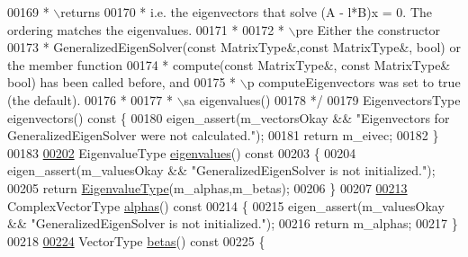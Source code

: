 \begin{DoxyCode}
00169 \textcolor{comment}{      * \(\backslash\)returns  %
00170 \textcolor{comment}{      * i.e. the eigenvectors that solve (A - l*B)x = 0. The ordering matches the eigenvalues.}
00171 \textcolor{comment}{      *}
00172 \textcolor{comment}{      * \(\backslash\)pre Either the constructor }
00173 \textcolor{comment}{      * GeneralizedEigenSolver(const MatrixType&,const MatrixType&, bool) or the member function}
00174 \textcolor{comment}{      * compute(const MatrixType&, const MatrixType& bool) has been called before, and}
00175 \textcolor{comment}{      * \(\backslash\)p computeEigenvectors was set to true (the default).}
00176 \textcolor{comment}{      *}
00177 \textcolor{comment}{      * \(\backslash\)sa eigenvalues()}
00178 \textcolor{comment}{      */}
00179     EigenvectorsType eigenvectors()\textcolor{keyword}{ const }\{
00180       eigen\_assert(m\_vectorsOkay && \textcolor{stringliteral}{"Eigenvectors for GeneralizedEigenSolver were not calculated."});
00181       \textcolor{keywordflow}{return} m\_eivec;
00182     \}
00183 
\hyperlink{group___eigenvalues___module_a62f01cd78271efd5e39bcb24e0fe1a58}{00202}     EigenvalueType \hyperlink{group___eigenvalues___module_a62f01cd78271efd5e39bcb24e0fe1a58}{eigenvalues}()\textcolor{keyword}{ const}
00203 \textcolor{keyword}{    }\{
00204       eigen\_assert(m\_valuesOkay && \textcolor{stringliteral}{"GeneralizedEigenSolver is not initialized."});
00205       \textcolor{keywordflow}{return} \hyperlink{group___eigenvalues___module_ad59af178acc401f1bc4e330ef80f286d}{EigenvalueType}(m\_alphas,m\_betas);
00206     \}
00207 
\hyperlink{group___eigenvalues___module_a82b1bc41267f46e5c5899d5b084a73bb}{00213}     ComplexVectorType \hyperlink{group___eigenvalues___module_a82b1bc41267f46e5c5899d5b084a73bb}{alphas}()\textcolor{keyword}{ const}
00214 \textcolor{keyword}{    }\{
00215       eigen\_assert(m\_valuesOkay && \textcolor{stringliteral}{"GeneralizedEigenSolver is not initialized."});
00216       \textcolor{keywordflow}{return} m\_alphas;
00217     \}
00218 
\hyperlink{group___eigenvalues___module_abeaa6f56cee367b83fd09d428462ca0c}{00224}     VectorType \hyperlink{group___eigenvalues___module_abeaa6f56cee367b83fd09d428462ca0c}{betas}()\textcolor{keyword}{ const}
00225 \textcolor{keyword}{    }\{
}
\end{DoxyCode}
